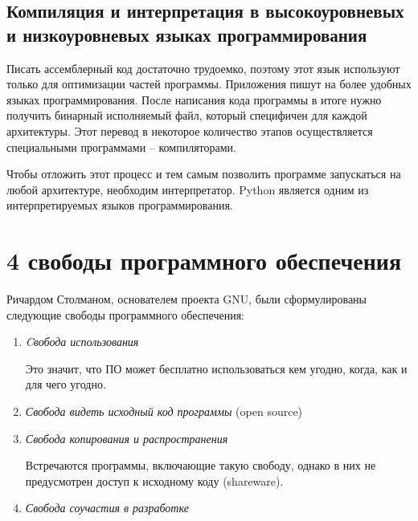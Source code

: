\documentclass[a4paper, fleqn]{article}
\begin{document}
			\subsection*{Компиляция и интерпретация в высокоуровневых и низкоуровневых языках программирования}
			
			Писать ассемблерный код достаточно трудоемко, поэтому этот язык используют только для оптимизации частей программы. Приложения пишут на более удобных языках программирования. После написания кода программы в итоге нужно получить бинарный исполняемый файл, который специфичен для каждой архитектуры. Этот перевод в некоторое количество этапов осуществляется специальными программами – компиляторами. 
			
			Чтобы отложить этот процесс и тем самым позволить программе запускаться на любой архитектуре, необходим интерпретатор.
			Python является одним из интерпретируемых языков программирования.
			
			\section*{4 свободы программного обеспечения}
			
			Ричардом Столманом, основателем проекта GNU, были сформулированы следующие свободы программного обеспечения:
			
			\begin{enumerate}
				\item \emph{Cвобода использования}
				
				Это значит, что ПО может бесплатно использоваться кем угодно, когда, как и для чего угодно.
				
				\item \emph{Свобода видеть исходный код программы} (open source)
				
				\item \emph{Свобода копирования и распространения}
				
				Встречаются программы, включающие такую свободу, однако в них не предусмотрен доступ к исходному коду (shareware).
				
				\item \emph{Свобода соучастия в разработке}
				
			\end{enumerate}	
	
\end{document}
